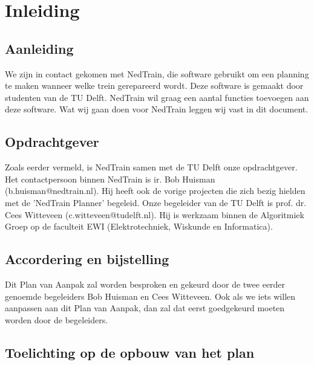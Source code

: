 \section{Inleiding}
\subsection{Aanleiding}
We zijn in contact gekomen met NedTrain, die software gebruikt om een planning te maken wanneer welke trein gerepareerd wordt. Deze software is gemaakt door studenten van de TU Delft. NedTrain wil graag een aantal functies toevoegen aan deze software. Wat wij gaan doen voor NedTrain leggen wij vast in dit document. 

\subsection{Opdrachtgever}
Zoals eerder vermeld, is NedTrain samen met de TU Delft onze opdrachtgever. Het contactpersoon binnen NedTrain is ir. Bob Huisman (b.huisman@nedtrain.nl). Hij heeft ook de vorige projecten die zich bezig hielden met de 'NedTrain Planner' begeleid. Onze begeleider van de TU Delft is prof. dr. Cees Witteveen (c.witteveen@tudelft.nl). Hij is werkzaam binnen de Algoritmiek Groep op de faculteit EWI (Elektrotechniek, Wiskunde en Informatica). 

\subsection{Accordering en bijstelling}
Dit Plan van Aanpak zal worden besproken en gekeurd door de twee eerder genoemde begeleiders Bob Huisman en Cees Witteveen. Ook als we iets willen aanpassen aan dit Plan van Aanpak, dan zal dat eerst goedgekeurd moeten worden door de begeleiders.

\subsection{Toelichting op de opbouw van het plan}
